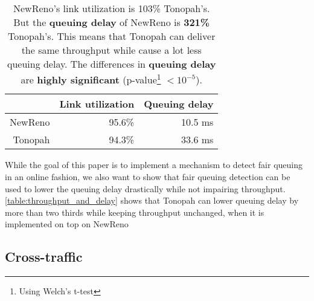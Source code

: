 \documentclass[conference]{IEEEtran}
\begin{document}
\begin{table}
\begin{minipage}{\columnwidth}
\centering
\begin{tabular}{| r | r | r |}
\hline
& Link utilization & Queuing delay \\ \hline
NewReno & 95.6\% & 10.5 ms \\ \hline
Tonopah & 94.3\% & 33.6 ms \\ \hline
\end{tabular}
\caption{NewReno's link utilization is 103\% Tonopah's. But the \textbf{queuing delay} of NewReno is \textbf{321\%} Tonopah's. This means that Tonopah can deliver the same throughput while cause a lot less queuing delay. The differences in \textbf{queuing delay} are \textbf{highly significant} (p-value\protect\footnote{Using Welch's t-test} $< 10^{-5}$).}
\label{table:throughput_and_delay}
\end{minipage}
\end{table}    

While the goal of this paper is to implement a mechanism to detect fair queuing in an online fashion, 
we also want to show that fair queuing detection can be used to lower the queuing delay drastically while not impairing throughput. 
\autoref{table:throughput_and_delay} shows that Tonopah can lower queuing delay by more than two thirds while keeping throughput unchanged, when it is implemented on top on NewReno

\subsection{Cross-traffic}
\end{document}
